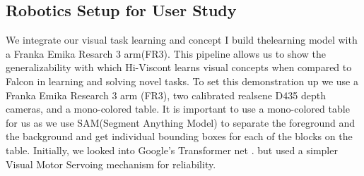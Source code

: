 \subsection{Robotics Setup for User Study}
We integrate our visual task learning and concept I build thelearning model with a Franka Emika Resarch 3 arm(FR3). 
This pipeline allows us to show the generalizability with which Hi-Viscont learns visual concepts when compared to Falcon  in learning and solving novel tasks. 
To set this demonstration up we use a Franka Emika Research 3 arm (FR3), two calibrated realsene D435 depth cameras, and a mono-colored table. 
It is important to use a mono-colored table for us as we use SAM(Segment Anything Model)  to separate the foreground and the background and get individual bounding boxes for each of the blocks on the table.
Initially, we looked into Google's Transformer net . 
but used a simpler Visual Motor Servoing mechanism for reliability.

